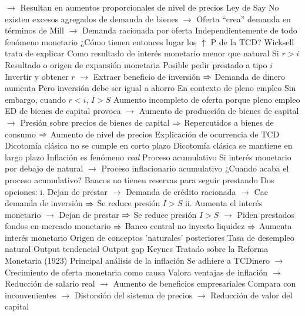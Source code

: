 \documentclass{nuevotema}
\begin{document}
\begin{esquemal}
				\4[] $\to$ Resultan en aumentos proporcionales de nivel de precios
				\4 Ley de Say
				\4[] No existen excesos agregados de demanda de bienes
				\4[] $\to$ Oferta ``crea'' demanda en términos de Mill
				\4[] $\to$ Demanda racionada por oferta
				\4[] Independientemente de todo fenómeno monetario
				\4[$\then$] ¿Cómo tienen entonces lugar los $\uparrow$ P de la TCD?
				\4 Wicksell trata de explicar
				\4[] Como resultado de interés monetario menor que natural
				\4 Si $r>i$
				\4[] Resultado o origen de expansión monetaria
				\4[] Posible pedir prestado a tipo $i$
				\4[] Invertir y obtener $r$
				\4[] $\to$ Extraer beneficio de inversión
				\4[] $\then$ Demanda de dinero aumenta
				\4 Pero inversión debe ser igual a ahorro
				\4[] En contexto de pleno empleo
				\4 Sin embargo, cuando $r<i$, $I > S$
				\4[] Aumento incompleto de oferta porque pleno empleo
				\4[] ED de bienes de capital provoca
				\4[] $\to$ Aumento de producción de bienes de capital
				\4[] $\to$ Presión sobre precios de bienes de capital
				\4[] $\then$ Repercutidos a bienes de consumo
				\4[] $\then$ Aumento de nivel de precios
				\4[$\then$] Explicación de ocurrencia de TCD
				\4[$\then$] Dicotomía clásica no se cumple en corto plazo
				\4[$\then$] Dicotomía clásica se mantiene en largo plazo
				\4[$\then$] Inflación es fenómeno \textit{real}
				\4 Proceso acumulativo
				\4[] Si interés monetario por debajo de natural
				\4[] $\to$ Proceso inflacionario acumulativo
				\4 ¿Cuando acaba el proceso acumulativo?
				\4[] Bancos no tienen reservas para seguir prestando
				\4[] Dos opciones:
				\4[] i. Dejan de prestar
				\4[] $\to$ Demanda de crédito racionada
				\4[] $\to$ Cae demanda de inversión
				\4[] $\then$ Se reduce presión $I>S$
				\4[] ii. Aumenta el interés monetario
				\4[] $\to$ Dejan de prestar
				\4[] $\then$ Se reduce presión $I>S$
				\4[] $\to$ Piden prestados fondos en mercado monetario
				\4[] $\then$ Banco central no inyecto liquidez
				\4[] $\then$ Aumenta interés monetario
				\4 Origen de conceptos 'naturales' posteriores
				\4[] Tasa de desempleo natural
				\4[] Output tendencial
				\4[] Output gap
			\3 Keynes
				\4 Tratado sobre la Reforma Monetaria (1923)
				\4[] Principal análisis de la inflación
				\4[] Se adhiere a TCDinero
				\4[] $\to$ Crecimiento de oferta monetaria como causa
				\4[] Valora ventajas de inflación
				\4[] $\to$ Reducción de salario real
				\4[] $\to$ Aumento de beneficios empresariales
				\4[] Compara con inconvenientes
				\4[] $\to$ Distorsión del sistema de precios
				\4[] $\to$ Reducción de valor del capital

\end{esquemal}
\end{document}
